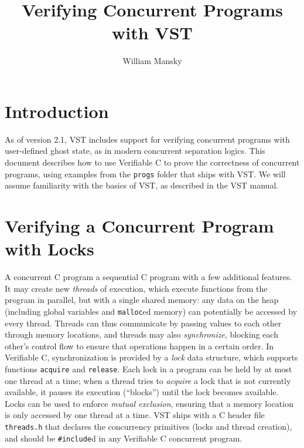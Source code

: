 \documentclass[11pt]{article} %
\title{Verifying Concurrent Programs with VST}
\author{William Mansky}
\date{} %
\begin{document}
\maketitle

\section{Introduction}

As of version 2.1, VST includes support for verifying concurrent programs with user-defined ghost state, as in modern concurrent separation logics. This document describes how to use Verifiable C to prove the correctness of concurrent programs, using examples from the \texttt{progs} folder that ships with VST. We will assume familiarity with the basics of VST, as described in the VST manual.

\section{Verifying a Concurrent Program with Locks}
A concurrent C program a sequential C program with a few additional features. It may create new \emph{threads} of execution, which execute functions from the program in parallel, but with a single shared memory: any data on the heap (including global variables and \texttt{malloc}ed memory) can potentially be accessed by every thread. Threads can thus communicate by passing values to each other through memory locations, and threads may also \emph{synchronize}, blocking each other's control flow to ensure that operations happen in a certain order. In Verifiable C, synchronization is provided by a \emph{lock} data structure, which supports functions \texttt{acquire} and \texttt{release}. Each lock in a program can be held by at most one thread at a time; when a thread tries to \emph{acquire} a lock that is not currently available, it pauses its execution (``blocks'') until the lock becomes available. Locks can be used to enforce \emph{mutual exclusion}, ensuring that a memory location is only accessed by one thread at a time. VST ships with a C header file \texttt{threads.h} that declares the concurrency primitives (locks and thread creation), and should be \texttt{\#include}d in any Verifiable C concurrent program.
\end{document}
